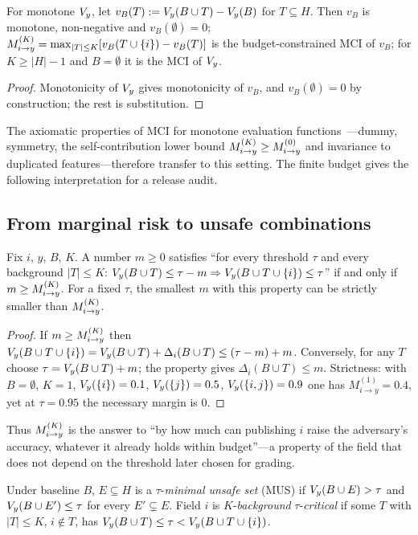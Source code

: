 \begin{proposition}\label{prop:mci}
For monotone $V_y$, let $v_B(T) := V_y(B \cup T) - V_y(B)$ for $T \subseteq H$. Then $v_B$ is monotone,
non-negative and $v_B(\emptyset)=0$; $M^{(K)}_{i\to y} = \max_{|T|\le K}[v_B(T\cup\{i\}) - v_B(T)]$ is the
budget-constrained MCI of $v_B$; for $K \ge |H|-1$ and $B=\emptyset$ it is the MCI of $V_y$.
\end{proposition}
\begin{proof}
Monotonicity of $V_y$ gives monotonicity of $v_B$, and
$v_B(\emptyset)=0$ by construction; the rest is substitution.
\end{proof}
The axiomatic properties of MCI for monotone evaluation functions~\cite{catav2021mci}---dummy,
symmetry, the self-contribution lower bound $M^{(K)}_{i\to y}\ge M^{(0)}_{i\to y}$ and invariance to
duplicated features---therefore transfer to this setting. The finite budget gives the following interpretation for a release audit.

\subsection{From marginal risk to unsafe combinations}
\begin{theorem}\label{thm:margin}
Fix $i$, $y$, $B$, $K$. A number $m\ge 0$ satisfies ``for every threshold $\tau$ and every
background $|T|\le K$: $V_y(B\cup T)\le\tau-m \Rightarrow V_y(B\cup T\cup\{i\})\le\tau$''
if and only if $m\ge M^{(K)}_{i\to y}$. For a fixed $\tau$, the smallest $m$ with this property can be
strictly smaller than $M^{(K)}_{i\to y}$.
\end{theorem}
\begin{proof}
If $m\ge M^{(K)}_{i\to y}$ then $V_y(B\cup T\cup\{i\})=V_y(B\cup T)+\Delta_i(B\cup T)\le(\tau-m)+m$.
Conversely, for any $T$ choose $\tau=V_y(B\cup T)+m$; the property gives $\Delta_i(B\cup T)\le
m$. Strictness: with $B=\emptyset$, $K=1$, $V_y(\{i\})=0.1$, $V_y(\{j\})=0.5$,
$V_y(\{i,j\})=0.9$ one has $M^{(1)}_{i\to y}=0.4$, yet at $\tau=0.95$ the necessary margin is $0$.
\end{proof}
Thus $M^{(K)}_{i\to y}$ is the answer to ``by how much can publishing $i$ raise the adversary's accuracy,
whatever it already holds within budget''---a property of the field that does not depend on
the threshold later chosen for grading.

\begin{definition}
Under baseline $B$, $E\subseteq H$ is a $\tau$-\emph{minimal unsafe set} (MUS) if
$V_y(B\cup E)>\tau$ and $V_y(B\cup E')\le\tau$ for every $E'\subsetneq E$. Field $i$ is
$K$-\emph{background} $\tau$-\emph{critical} if some $T$ with $|T|\le K$, $i\notin T$, has
$V_y(B\cup T)\le\tau<V_y(B\cup T\cup\{i\})$.
\end{definition}

